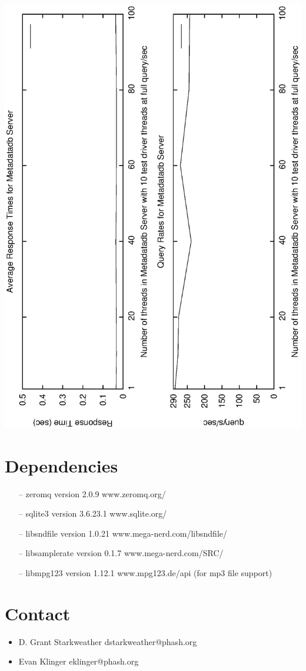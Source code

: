 \documentclass[11pt, a4paper]{article}
\begin{document}
\includegraphics[angle=-90,width=\linewidth]{mdperfthreads2.eps}

\section{Dependencies}
\begin{itemize}
\item[--] zeromq version 2.0.9 www.zeromq.org/
\item[--] sqlite3 version 3.6.23.1  www.sqlite.org/
\item[--] libsndfile version 1.0.21 www.mega-nerd.com/libsndfile/
\item[--] libsamplerate version 0.1.7 www.mega-nerd.com/SRC/
\item[--] libmpg123 version 1.12.1 www.mpg123.de/api (for mp3 file support)
\end{itemize}
\section{Contact}
\begin{itemize}
\item D. Grant Starkweather dstarkweather@phash.org\\
\item Evan Klinger  eklinger@phash.org\\
\end{itemize}
\end{document}

